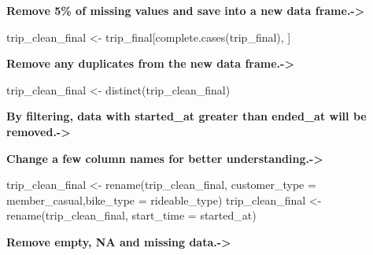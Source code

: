 \documentclass[
]{article}
\newenvironment{Shaded}{\begin{snugshade}}{\end{snugshade}}
\newcommand{\AttributeTok}[1]{\textcolor[rgb]{0.77,0.63,0.00}{#1}}
\newcommand{\FunctionTok}[1]{\textcolor[rgb]{0.00,0.00,0.00}{#1}}
\newcommand{\NormalTok}[1]{#1}
\newcommand{\OtherTok}[1]{\textcolor[rgb]{0.56,0.35,0.01}{#1}}
\newcommand{\SpecialCharTok}[1]{\textcolor[rgb]{0.00,0.00,0.00}{#1}}
\begin{document}
\textbf{Remove 5\% of missing values and save into a new data
frame.-\textgreater{}}

\begin{Shaded}
\begin{Highlighting}[]
\NormalTok{trip\_clean\_final }\OtherTok{\textless{}{-}}\NormalTok{ trip\_final[}\FunctionTok{complete.cases}\NormalTok{(trip\_final), ]}
\end{Highlighting}
\end{Shaded}

\textbf{Remove any duplicates from the new data frame.-\textgreater{}}

\begin{Shaded}
\begin{Highlighting}[]
\NormalTok{trip\_clean\_final }\OtherTok{\textless{}{-}} \FunctionTok{distinct}\NormalTok{(trip\_clean\_final)}
\end{Highlighting}
\end{Shaded}

\textbf{By filtering, data with started\_at greater than ended\_at will
be removed.-\textgreater{}}

\begin{Shaded}
\end{Shaded}

\textbf{Change a few column names for better
understanding.-\textgreater{}}

\begin{Shaded}
\begin{Highlighting}[]
\NormalTok{trip\_clean\_final }\OtherTok{\textless{}{-}} \FunctionTok{rename}\NormalTok{(trip\_clean\_final, }\AttributeTok{customer\_type =}\NormalTok{ member\_casual,}\AttributeTok{bike\_type =}\NormalTok{ rideable\_type)}
\NormalTok{trip\_clean\_final }\OtherTok{\textless{}{-}} \FunctionTok{rename}\NormalTok{(trip\_clean\_final, }\AttributeTok{start\_time =}\NormalTok{ started\_at)}
\end{Highlighting}
\end{Shaded}

\textbf{Remove empty, NA and missing data.-\textgreater{}}
\end{document}
